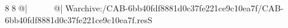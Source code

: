 8  8  @|                                                   @| W   archive:/CAB-6bb40fdf8881d0c37fe221ce9c10ea7f/CAB-6bb40fdf8881d0c37fe221ce9c10ea7f.resS 
